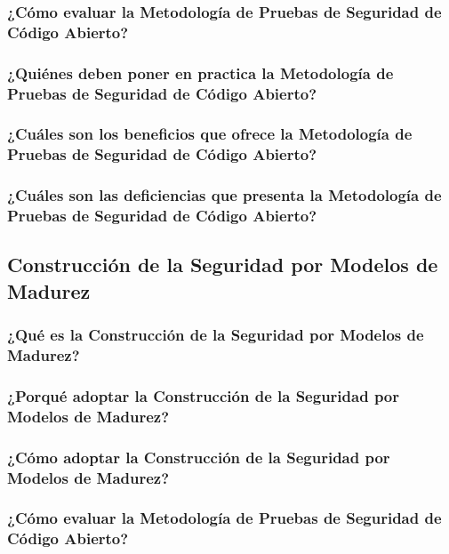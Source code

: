 \documentclass[runningheads,a4paper]{llncs}
\begin{document}
\subsubsection{¿Cómo evaluar la Metodología de Pruebas de Seguridad de Código Abierto?}

\subsubsection{¿Quiénes deben poner en practica la Metodología de Pruebas de Seguridad de Código Abierto?}

\subsubsection{¿Cuáles son los beneficios que ofrece la Metodología de Pruebas de Seguridad de Código Abierto?}

\subsubsection{¿Cuáles son las deficiencias que presenta la Metodología de Pruebas de Seguridad de Código Abierto?}


\subsection{Construcción de la Seguridad por Modelos de Madurez}

\subsubsection{¿Qué es la Construcción de la Seguridad por Modelos de Madurez?}

\subsubsection{¿Porqué adoptar la Construcción de la Seguridad por Modelos de Madurez?}

\subsubsection{¿Cómo adoptar la Construcción de la Seguridad por Modelos de Madurez?}

\subsubsection{¿Cómo evaluar la Metodología de Pruebas de Seguridad de Código Abierto?}
\end{document}
